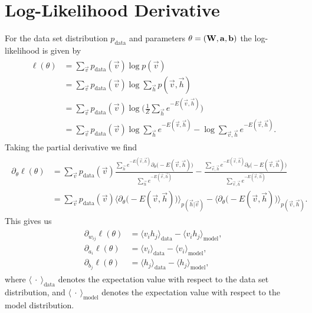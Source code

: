 \section{Log-Likelihood Derivative}\label{app:rbm_log_likelihood_derivation}
For the data set distribution \( p_\text{data} \) and parameters \( \theta = (\mathbf{W}, \mathbf{a}, \mathbf{b}) \) the log-likelihood is given by
\begin{align}
\begin{split}
    \ell(\theta)
        &= \sum_{\vec{v}} p_{\text{data}}(\vec{v}) \log p(\vec{v}) \\
        &= \sum_{\vec{v}} p_{\text{data}}(\vec{v}) \log \sum_\vec{h} p(\vec{v},\vec{h}) \\
        &= \sum_{\vec{v}} p_{\text{data}}(\vec{v}) \log \bigg(\frac{1}{Z} \sum_\vec{h} e^{-E(\vec{v},\vec{h})}\bigg) \\
        &= \sum_{\vec{v}} p_{\text{data}}(\vec{v}) \log \sum_\vec{h} e^{-E(\vec{v},\vec{h})} - \log \sum_{\vec{v},\vec{h}} e^{-E(\vec{v},\vec{h})}.
\end{split}
\end{align}
Taking the partial derivative we find
\begin{align}
\begin{split}
    \partial_{\theta} \ell(\theta)
        &= \sum_{\vec{v}} p_{\text{data}}(\vec{v}) \frac{\sum_\vec{h} e^{-E(\vec{v},\vec{h})} \partial_{\theta}\big( -E(\vec{v},\vec{h}) \big) }{\sum_\vec{h} e^{-E(\vec{v},\vec{h})}}
            - \frac{\sum_{\vec{v},\vec{h}} e^{-E(\vec{v},\vec{h})} \partial_{\theta}\big( -E(\vec{v},\vec{h}) \big) }{\sum_{\vec{v},\vec{h}} e^{-E(\vec{v},\vec{h})}} \\
        &= \sum_{\vec{v}} p_{\text{data}}(\vec{v}) \Big\langle \partial_{\theta}\big( -E(\vec{v},\vec{h}) \big) \Big\rangle_{p(\vec{h}|\vec{v})}
        - \Big\langle \partial_{\theta}\big( -E(\vec{v},\vec{h}) \big) \Big\rangle_{p(\vec{v},\vec{h})}.
\end{split}
\end{align}
This gives us
\begin{align}
\begin{split}
    \partial_{w_{ij}} \ell(\theta)
        &= \langle v_i h_j \rangle_{\text{data}} - \langle v_i h_j \rangle_{\text{model}}, \\
    \partial_{a_i} \ell(\theta)
        &= \langle v_i \rangle_{\text{data}} - \langle v_i \rangle_{\text{model}}, \\
    \partial_{b_j} \ell(\theta)
        &= \langle h_j \rangle_{\text{data}} - \langle h_j \rangle_{\text{model}},
\end{split}
\end{align}
where \( \langle \ \cdot \ \rangle_{\text{data}} \) denotes the expectation value with respect to the data set distribution, and \( \langle \ \cdot \ \rangle_{\text{model}} \) denotes the expectation value with respect to the model distribution.

